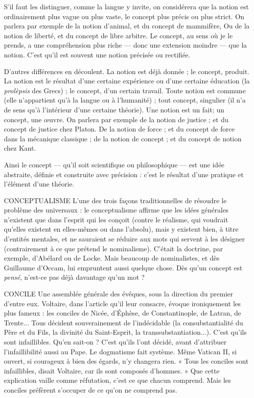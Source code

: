 S’il faut les distinguer, comme la langue y invite, on considérera que la
notion est ordinairement plus vague ou plus vaste, le concept plus précis ou
plus strict. On parlera par exemple de la notion d’animal, et du concept de
mammifère, Ou de la notion de liberté, et du concept de libre arbitre. Le
concept, au sens où je le prends, a une compréhension plus riche — donc une
extension moindre — que la notion. C’est qu’il est souvent une notion précisée
ou rectifiée.

D’autres différences en découlent. La notion est déjà donnée ; le concept,
produit. La notion est le résultat d’une certaine expérience ou d’une certaine
éducation (la {\it prolèpsis} des Grecs) ; le concept, d’un certain travail. Toute
notion est commune (elle n'appartient qu’à la langue ou à l'humanité) ; tout
concept, singulier (il n’a de sens qu’à l’intérieur d’une certaine théorie). Une
notion est un fait; un concept, une œuvre. On parlera par exemple de la
notion de justice ; et du concept de justice chez Platon. De la notion de force ;
et du concept de force dans la mécanique classique ; de la notion de concept ;
et du concept de notion chez Kant.

Ainsi le concept — qu’il soit scientifique ou philosophique — est une idée
abstraite, définie et construite avec précision : c’est le résultat d’une pratique et
l'élément d’une théorie.

CONCEPTUALISME L’une des trois façons traditionnelles de résoudre le
problème des universaux : le conceptualisme affirme
que les idées générales n'existent que dans l’esprit qui les conçoit (contre le réalisme,
qui voudrait qu’elles existent en elles-mêmes ou dans l'absolu), mais y
existent bien, à titre d’entités mentales, et ne sauraient se réduire aux mots qui
servent à les désigner (contrairement à ce que prétend le nominalisme). C'était
la doctrine, par exemple, d’Abélard ou de Locke. Mais beaucoup de nominalistes,
et dès Guillaume d’Occam, lui empruntent aussi quelque chose. Dès
qu’un concept est {\it pensé}, n’est-ce pas déjà davantage qu’un mot ?

CONCILE Une assemblée générale des évêques, sous la direction du premier
d’entre eux. Voltaire, dans l’article qu’il leur consacre,
évoque ironiquement les plus fameux : les conciles de Nicée, d’Éphèse, de
Constantinople, de Latran, de Trente... Tous décident souverainement de
l’indécidable (la consubstantialité du Père et du Fils, la divinité du Saint-Esprit,
la transsubstantiation...). C’est qu’ils sont infaillibles. Qu’en sait-on ? C’est
qu’ils l'ont décidé, avant d’attribuer l’infaillibilité aussi au Pape. Le dogmatisme
fait système. Même Vatican II, si ouvert, si courageux à bien des égards,
n’y changera rien. « Tous les conciles sont infaillibles, disait Voltaire, car ils
sont composés d’hommes. » Que cette explication vaille comme réfutation,
c'est ce que chacun comprend. Mais les conciles préfèrent s'occuper de ce
qu’on ne comprend pas.

